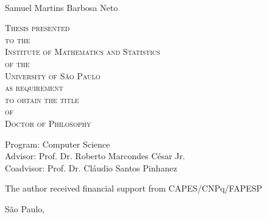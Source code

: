 \documentclass[11pt,twoside,a4paper]{book}
\begin{document}
\hypersetup{pageanchor=false}
\frontmatter
\fancyhead[RO]{{\footnotesize\rightmark}\hspace{2em}\thepage}
\setcounter{tocdepth}{2}
\fancyhead[LE]{\thepage\hspace{2em}\footnotesize{\leftmark}}
\fancyhead[RE,LO]{}
\fancyhead[RO]{{\footnotesize\rightmark}\hspace{2em}\thepage}

\onehalfspacing  %

\thispagestyle{empty}
\begin{center}
    \vspace*{2.3cm}
    \textbf{\Large{\phdTitle}}\\
    
    \vspace*{1.2cm}
    \Large{Samuel Martins Barbosa Neto}
    
    \vskip 2cm
    \textsc{
    Thesis presented\\[-0.25cm] 
    to the\\[-0.25cm]
    Institute of Mathematics and Statistics\\[-0.25cm]
    of the\\[-0.25cm]
    University of São Paulo\\[-0.25cm]
    as requirement\\[-0.25cm]
    to obtain the title\\[-0.25cm]
    of\\[-0.25cm]
    Doctor of Philosophy}
    
    \vskip 1.5cm
    Program: Computer Science\\
    Advisor: Prof. Dr. Roberto Marcondes César Jr.\\
    Coadvisor: Prof. Dr. Cláudio Santos Pinhanez

       \vskip 1cm
    \normalsize{The author received financial support from CAPES/CNPq/FAPESP}
    
    \vskip 0.5cm
    \normalsize{São Paulo, \thesisMonth~\thesisYear}
\end{center}

%
%
%
\newpage
\thispagestyle{empty}
    \begin{center}
        \vspace*{2.3 cm}
        \textbf{\Large{\phdTitle}}\\
        \vspace*{2 cm}
    \end{center}
\end{document}
